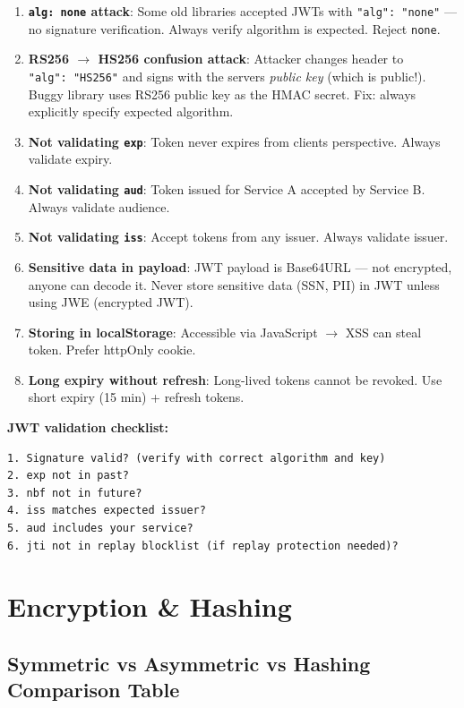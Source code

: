 \documentclass[11pt]{article}
\begin{document}
\begin{enumerate}
\def\labelenumi{\arabic{enumi}.}
\item
  \textbf{\texttt{alg:\ none} attack}: Some old libraries accepted JWTs with \texttt{"alg":\ "none"} --- no signature verification. Always verify algorithm is expected. Reject \texttt{none}.
\item
  \textbf{RS256 \(\rightarrow\) HS256 confusion attack}: Attacker changes header to \texttt{"alg":\ "HS256"} and signs with the server\textquotesingle s \emph{public key} (which is public!). Buggy library uses RS256 public key as the HMAC secret. Fix: always explicitly specify expected algorithm.
\item
  \textbf{Not validating \texttt{exp}}: Token never expires from client\textquotesingle s perspective. Always validate expiry.
\item
  \textbf{Not validating \texttt{aud}}: Token issued for Service A accepted by Service B. Always validate audience.
\item
  \textbf{Not validating \texttt{iss}}: Accept tokens from any issuer. Always validate issuer.
\item
  \textbf{Sensitive data in payload}: JWT payload is Base64URL --- not encrypted, anyone can decode it. Never store sensitive data (SSN, PII) in JWT unless using JWE (encrypted JWT).
\item
  \textbf{Storing in localStorage}: Accessible via JavaScript \(\rightarrow\) XSS can steal token. Prefer httpOnly cookie.
\item
  \textbf{Long expiry without refresh}: Long-lived tokens cannot be revoked. Use short expiry (15 min) + refresh tokens.
\end{enumerate}

\textbf{JWT validation checklist:}

\setcodelang{}

\begin{verbatim}
1. Signature valid? (verify with correct algorithm and key)
2. exp not in past?
3. nbf not in future?
4. iss matches expected issuer?
5. aud includes your service?
6. jti not in replay blocklist (if replay protection needed)?
\end{verbatim}

\section{Encryption \& Hashing}\label{encryption--hashing}

\subsection{Symmetric vs Asymmetric vs Hashing Comparison Table}\label{symmetric-vs-asymmetric-vs-hashing-comparison-table}
\end{document}
